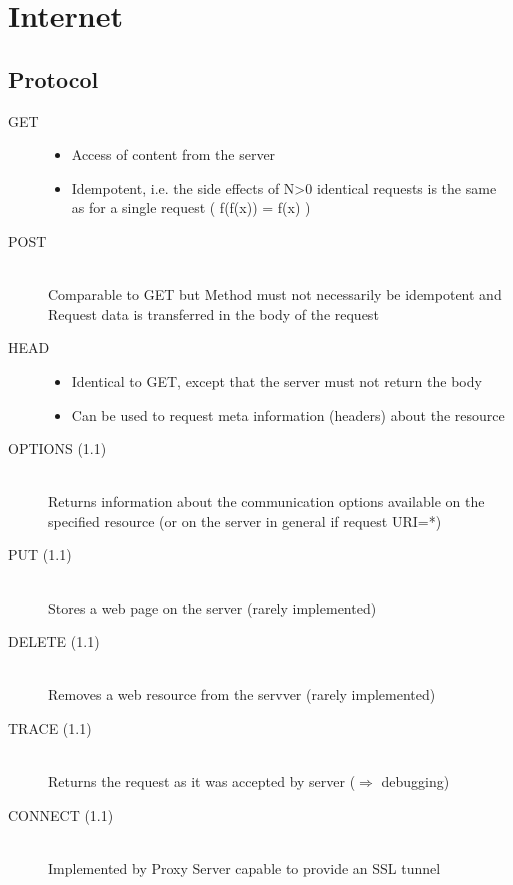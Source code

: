 \documentclass[10pt]{article}
\newcommand{\Ra}{\Rightarrow}
\begin{document}
\newpage
\section{Internet}
\subsection{Protocol}
\begin{description}	
	\item[GET] \hfill
	\begin{itemize}
		\item Access of content from the server
		\item Idempotent, i.e. the side effects of N>0 identical requests is the same as for a single request ( f(f(x)) = f(x) )
	\end{itemize}
	\item[POST] \hfill \\
		Comparable to GET but Method must not necessarily be idempotent and Request data is transferred in the body of the request
	\item[HEAD] \hfill
	\begin{itemize}
		\item Identical to GET, except that the server must not return the body
		\item Can be used to request meta information (headers) about the resource
	\end{itemize}
	\item[OPTIONS (1.1)] \hfill \\
		Returns information about the communication options available on the specified resource (or on the server in general if request URI=*)
	\item[PUT (1.1)] \hfill \\
		Stores a web page on the server (rarely implemented)
	\item[DELETE (1.1)] \hfill \\
		Removes a web resource from the servver (rarely implemented)
	\item[TRACE (1.1)] \hfill \\
		Returns the request as it was accepted by server ($\Ra$ debugging)
	\item[CONNECT (1.1)] \hfill \\
		Implemented by Proxy Server capable to provide an SSL tunnel
\end{description}
\end{document}
